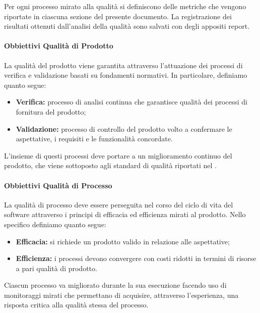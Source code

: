 	Per ogni processo mirato alla qualità si definiscono delle metriche che vengono riportate in ciascuna sezione del presente documento. 
	La registrazione dei risultati ottenuti dall'analisi della qualità sono salvati con degli appositi report.

		\paragraph{Obbiettivi Qualità di Prodotto}

		La qualità del prodotto viene garantita attraverso l'attuazione dei processi di verifica e validazione basati su fondamenti normativi. In particolare, definiamo quanto segue:
		\begin{itemize}
			\item \textbf{Verifica:} processo di analisi continua che garantisce qualità dei processi di fornitura del prodotto;
			\item \textbf{Validazione:} processo di controllo del prodotto volto a confermare le aspettative, i requisiti e le funzionalità concordate.
		\end{itemize}

		L'insieme di questi processi deve portare a un miglioramento continuo del prodotto, che viene sottoposto agli standard di qualità riportati nel . 

		\paragraph{Obbiettivi Qualità di Processo}

		La qualità di processo deve essere perseguita nel corso del ciclo di vita del software attraverso i principi di efficacia ed efficienza mirati al prodotto. 
		Nello specifico definiamo quanto segue:
		\begin{itemize}
			\item \textbf{Efficacia:} si richiede un prodotto valido in relazione alle aspettative;
			\item \textbf{Efficienza:} i processi devono convergere con costi ridotti in termini di risorse a pari qualità di prodotto.
		\end{itemize}

		Ciascun processo va migliorato durante la sua esecuzione facendo uso di monitoraggi mirati che permettano di acquisire, attraverso l'esperienza, una risposta critica alla qualità stessa del processo. \\ 


